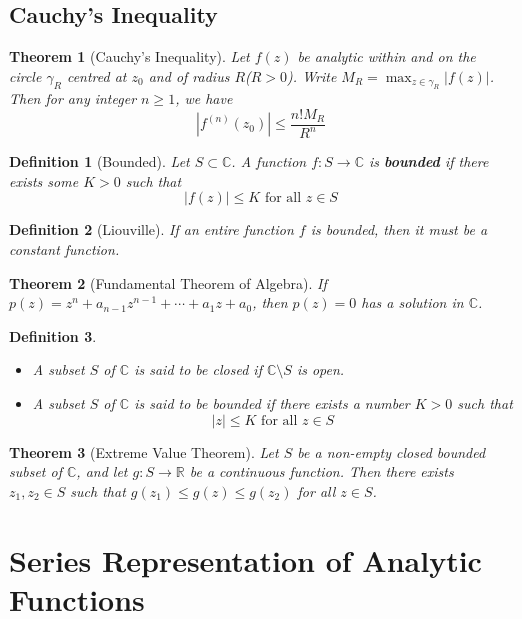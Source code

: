 \documentclass[12pt]{article}
\newtheorem{definition}{Definition}[section]
\newtheorem{theorem}{Theorem}[section]
\theoremstyle{definition}
\begin{document}
\subsection{Cauchy's Inequality}
\begin{theorem}[Cauchy's Inequality]
\normalfont Let $f(z)$ be analytic within and on the circle $\gamma_R$ centred at $z_0$ and of radius $R$($R>0$). Write $M_R=\max_{z\in\gamma_{R}}|f(z)|$. Then for any integer $n\geq 1$, we have
\[
|f^{(n)}(z_0)|\leq \frac{n!M_R}{R^n}
\]
\end{theorem}
\begin{definition}[Bounded]
\normalfont Let $S\subset \mathbb{C}$. A function $f:S\to \mathbb{C}$ is \textbf{bounded} if there exists some $K>0$ such that
\[
|f(z)|\leq K \text{ for all }z\in S
\]
\end{definition}
\begin{definition}[Liouville]
\normalfont If an entire function $f$ is bounded, then it must be a constant function.
\end{definition}
\begin{theorem}[Fundamental Theorem of Algebra]
\normalfont If $p(z)=z^n + a_{n-1}z^{n-1}+ \cdots + a_1z + a_0$, then $p(z)=0$ has a solution in $\mathbb{C}$.
\end{theorem}
\begin{definition}
\begin{itemize}
	\item A subset $S$ of $\mathbb{C}$ is said to be closed if $\mathbb{C}\setminus S$ is open.
	\item A subset $S$ of $\mathbb{C}$ is said to be bounded if there exists a number $K>0$ such that 
\[
|z|\leq K \text{ for all }z\in S
\]
\end{itemize}
\end{definition}
\begin{theorem}[Extreme Value Theorem]
\normalfont Let $S$ be a non-empty closed bounded subset of $\mathbb{C}$, and let $g:S\to\mathbb{R}$ be a continuous function. Then there exists $z_1,z_2\in S$ such that $g(z_1)\leq g(z)\leq g(z_2)$ for all $z\in S$.
\end{theorem}
\section{Series Representation of Analytic Functions}
\end{document}
